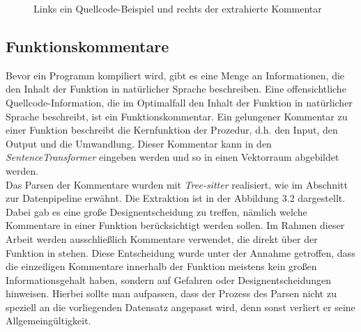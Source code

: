 \documentclass[12pt,letterpaper,ngerman]{article}
\begin{document}
%
\pagebreak

\begin{figure}
  \begin{center}
    \begin{minipage}[c]{6cm}
        \centering
        \inputminted[fontsize=\scriptsize]{c}{comments.c}
    \end{minipage}
    \hspace{0.1cm}
    \begin{minipage}[c]{6cm}
        \centering
        \inputminted[fontsize=\scriptsize]{json}{comments.json}
    \end{minipage}
  \end{center}
  \caption{Links ein Quellcode-Beispiel und rechts der extrahierte Kommentar}
\end{figure}

\subsection{Funktionskommentare}
Bevor ein Programm kompiliert wird, gibt es eine Menge an
Informationen, die den Inhalt der Funktion in natürlicher Sprache 
beschreiben. Eine offensichtliche Quellcode-Information, die im
Optimalfall den Inhalt der Funktion in natürlicher Sprache 
beschreibt, ist ein Funktionskommentar. Ein gelungener Kommentar
zu einer
Funktion beschreibt die Kernfunktion der Prozedur, d.h. den Input,
den Output und die Umwandlung. Dieser Kommentar kann in den 
\textit{SentenceTransformer} eingeben werden und so in einen
Vektorraum abgebildet werden.\\
Das Parsen der Kommentare wurden mit \textit{Tree-sitter} realisiert,
wie im Abschnitt zur Datenpipeline erwähnt. Die Extraktion ist in 
der Abbildung 3.2 dargestellt.\\
Dabei gab es eine große
Designentscheidung zu treffen, nämlich welche Kommentare in einer 
Funktion berücksichtigt werden sollen.
Im Rahmen dieser Arbeit werden ausschließlich Kommentare verwendet,
die direkt  über der Funktion in stehen. Diese Entscheidung
wurde unter der Annahme getroffen, dass die einzeiligen
Kommentare innerhalb der Funktion meistens kein großen
Informationsgehalt haben, sondern auf
Gefahren oder Designentscheidungen hinweisen.
Hierbei sollte man aufpassen, dass der Prozess des Parsen nicht zu
speziell an die vorliegenden Datensatz angepasst wird, denn sonst 
verliert er seine Allgemeingültigkeit. 
\end{document}
